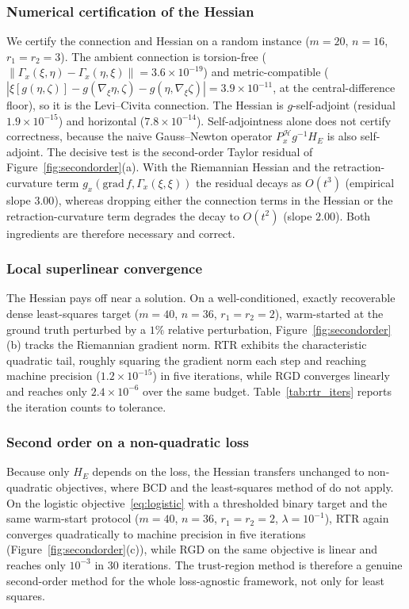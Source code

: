 \documentclass[letterpaper, 10 pt, conference]{ieeeconf}
\newcommand{\cH}{\mathcal{H}}
\theoremstyle{plain}
\theoremstyle{definition}
\theoremstyle{remark}
\begin{document}
\subsubsection{Numerical certification of the Hessian}
We certify the connection and Hessian on a random instance ($m{=}20$, $n{=}16$, $r_1{=}r_2{=}3$). The ambient connection is torsion-free ($\|\Gamma_x(\xi,\eta)-\Gamma_x(\eta,\xi)\| = 3.6\times10^{-19}$) and metric-compatible ($|\xi[g(\eta,\zeta)] - g(\nabla_\xi\eta,\zeta) - g(\eta,\nabla_\xi\zeta)| = 3.9\times10^{-11}$, at the central-difference floor), so it is the Levi--Civita connection. The Hessian is $g$-self-adjoint (residual $1.9\times10^{-15}$) and horizontal ($7.8\times10^{-14}$). Self-adjointness alone does not certify correctness, because the naive Gauss--Newton operator $P_x^{\cH}g^{-1}H_E$ is also self-adjoint. The decisive test is the second-order Taylor residual of Figure~\ref{fig:secondorder}(a). With the Riemannian Hessian and the retraction-curvature term $g_x(\mathrm{grad}\,f,\Gamma_x(\xi,\xi))$ the residual decays as $O(t^3)$ (empirical slope $3.00$), whereas dropping either the connection terms in the Hessian or the retraction-curvature term degrades the decay to $O(t^2)$ (slope $2.00$). Both ingredients are therefore necessary and correct.

\subsubsection{Local superlinear convergence}
The Hessian pays off near a solution. On a well-conditioned, exactly recoverable dense least-squares target ($m{=}40$, $n{=}36$, $r_1{=}r_2{=}2$), warm-started at the ground truth perturbed by a $1\%$ relative perturbation, Figure~\ref{fig:secondorder}(b) tracks the Riemannian gradient norm. RTR exhibits the characteristic quadratic tail, roughly squaring the gradient norm each step and reaching machine precision ($1.2\times10^{-15}$) in five iterations, while RGD converges linearly and reaches only $2.4\times10^{-6}$ over the same budget. Table~\ref{tab:rtr_iters} reports the iteration counts to tolerance.

\subsubsection{Second order on a non-quadratic loss}
Because only $H_E$ depends on the loss, the Hessian transfers unchanged to non-quadratic objectives, where BCD and the least-squares method of \citet{gillis2026manifold} do not apply. On the logistic objective~\eqref{eq:logistic} with a thresholded binary target and the same warm-start protocol ($m{=}40$, $n{=}36$, $r_1{=}r_2{=}2$, $\lambda{=}10^{-1}$), RTR again converges quadratically to machine precision in five iterations (Figure~\ref{fig:secondorder}(c)), while RGD on the same objective is linear and reaches only $10^{-3}$ in $30$ iterations. The trust-region method is therefore a genuine second-order method for the whole loss-agnostic framework, not only for least squares.
\end{document}
